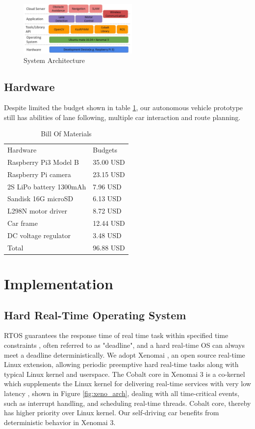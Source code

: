 \documentclass[conference]{IEEEtran}
\begin{document}
\FloatBarrier

\begin{figure}
	\centering
	\includegraphics[width=2.3in]{img/soft_arch.jpg}
	\caption{System Architecture}
	\label{fig:overall_arch}
\end{figure}

\subsection{Hardware}

Despite limited the budget shown in table \ref{hardware_list}, our autonomous vehicle prototype still has abilities of lane following, multiple car interaction and route planning.

\begin{table}
	\centering
	\caption{Bill Of Materials}
	\label{hardware_list}
	\begin{tabular}{ll}
		Hardware                & Budgets  \\
		Raspberry Pi3 Model B   & 35.00 USD \\
		Raspberry Pi camera     & 23.15 USD  \\
		2S LiPo battery 1300mAh & 7.96 USD  \\
		Sandisk 16G microSD     & 6.13 USD  \\
		L298N motor driver      & 8.72 USD  \\
		Car frame               & 12.44 USD  \\
		DC voltage regulator    &  3.48 USD  \\
		Total                   & 96.88 USD
	\end{tabular}
\end{table}

\section{Implementation}

\subsection{Hard Real-Time Operating System}

RTOS guarantees the response time of real time task within specified time constraints \cite{RTOS}, often referred to as "deadline", and a hard real-time OS can always meet a deadline deterministically. We adopt Xenomai \cite{Xenomai}, an open source real-time Linux extension, allowing periodic preemptive hard real-time tasks along with typical Linux kernel and userspace. The Cobalt core in Xenomai 3 is a co-kernel which supplements the Linux kernel for delivering real-time services with very low latency \cite{rtlws2015}, shown in Figure \ref{fig:xeno_arch}, dealing with all time-critical events, such as interrupt handling, and scheduling real-time threads. Cobalt core, thereby has higher priority over Linux kernel. Our self-driving car benefits from deterministic behavior in Xenomai 3.
\end{document}
